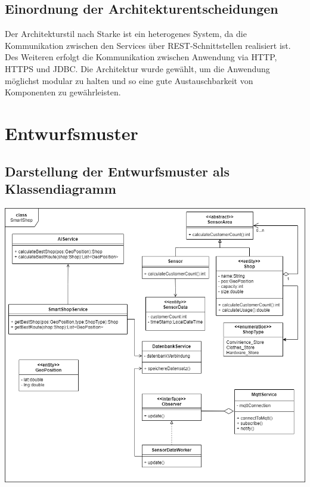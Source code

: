 \documentclass[runningheads]{llncs}
\begin{document}
\subsection{Einordnung der Architekturentscheidungen}
Der Architekturstil nach Starke ist ein heterogenes System, da die Kommunikation zwischen den Services über REST-Schnittstellen realisiert ist.
Des Weiteren erfolgt die Kommunikation zwischen Anwendung via HTTP, HTTPS und JDBC.
Die Architektur wurde gewählt, um die Anwendung möglichst modular zu halten und so eine gute Austauschbarkeit von Komponenten zu gewährleisten.

\newpage
\section{Entwurfsmuster}

\subsection{Darstellung der Entwurfsmuster als Klassendiagramm}
\includegraphics[width=\linewidth]{images/OOD-Klassendiagram}
\end{document}
